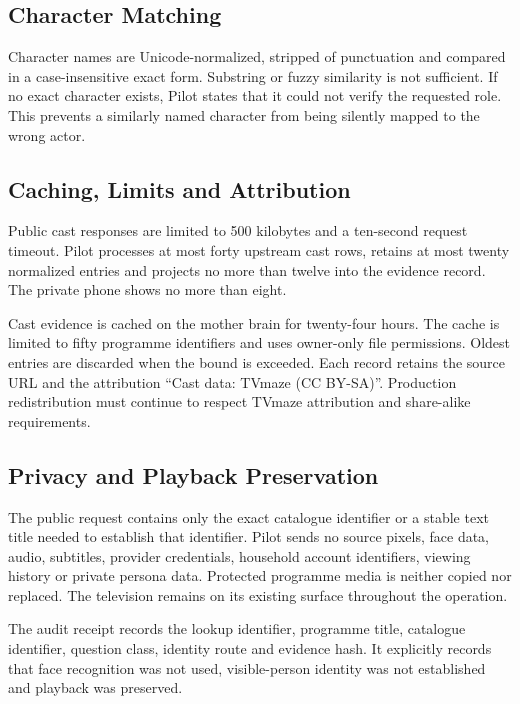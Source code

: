 \subsection{Character Matching}

Character names are Unicode-normalized, stripped of punctuation and compared in a
case-insensitive exact form. Substring or fuzzy similarity is not sufficient. If no
exact character exists, Pilot states that it could not verify the requested role.
This prevents a similarly named character from being silently mapped to the wrong
actor.

\subsection{Caching, Limits and Attribution}

Public cast responses are limited to 500 kilobytes and a ten-second request timeout.
Pilot processes at most forty upstream cast rows, retains at most twenty normalized
entries and projects no more than twelve into the evidence record. The private phone
shows no more than eight.

Cast evidence is cached on the mother brain for twenty-four hours. The cache is
limited to fifty programme identifiers and uses owner-only file permissions. Oldest
entries are discarded when the bound is exceeded. Each record retains the source
URL and the attribution ``Cast data: TVmaze (CC BY-SA)''. Production redistribution
must continue to respect TVmaze attribution and share-alike requirements.

\subsection{Privacy and Playback Preservation}

The public request contains only the exact catalogue identifier or a stable text
title needed to establish that identifier. Pilot sends no source pixels, face data,
audio, subtitles, provider credentials, household account identifiers, viewing
history or private persona data. Protected programme media is neither copied nor
replaced. The television remains on its existing surface throughout the operation.

The audit receipt records the lookup identifier, programme title, catalogue
identifier, question class, identity route and evidence hash. It explicitly records
that face recognition was not used, visible-person identity was not established and
playback was preserved.

